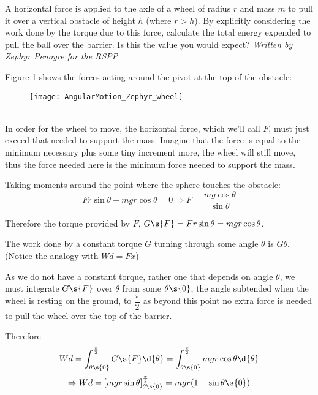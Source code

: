 \begin{problem}[Zephyr_ball_diagram] %
{A horizontal force is applied to the axle of a wheel of radius $r$ and mass $m$ to pull it over a vertical obstacle of height $h$ (where $r > h$). By explicitly considering the work done by the torque due to this force, calculate the total energy expended to pull the ball over the barrier. Is this the value you would expect?}
{\textit{Written by Zephyr Penoyre for the RSPP}}
{
Figure \ref{fig:AngularMotion_Zephyr_wheel} shows the forces acting around the pivot at the top of the obstacle:
\begin{figure}[h]
\centering
\texttt{[image: AngularMotion\_Zephyr\_wheel]}
\caption{}
\label{fig:AngularMotion_Zephyr_wheel}
\end{figure}
\\
In order for the wheel to move, the horizontal force, which we'll call $F$, must just exceed that needed to support the mass. Imagine that the force is equal to the minimum necessary plus some tiny increment more, the wheel will still move, thus the force needed here is the minimum force needed to support the mass.

Taking moments around the point where the sphere touches the obstacle:
\begin{equation*}
Fr\sin{\theta} - mgr\cos{\theta} = 0 \Rightarrow F = \dfrac{mg\cos{\theta}}{\sin{\theta}}
\end{equation*}

Therefore the torque provided by $F$, $G\s{F} = Fr\sin{\theta} = mgr\cos{\theta}$.

The work done by a constant torque $G$ turning through some angle $\theta$ is $G\theta$. (Notice the analogy with $Wd = F x$)

As we do not have a constant torque, rather one that depends on angle $\theta$, we must integrate $G\s{F}$ over $\theta$ from some $\theta\s{0}$, the angle subtended when the wheel is resting on the ground, to $\dfrac{\pi}{2}$ as beyond this point no extra force is needed to pull the wheel over the top of the barrier.

Therefore
\begin{equation*}
Wd = \int_{\theta\s{0}}^{\frac{\pi}{2}} G\s{F} \d{\theta} =  \int_{\theta\s{0}}^{\frac{\pi}{2}} mgr\cos{\theta} \d{\theta}
\end{equation*}
\begin{equation}
\Rightarrow Wd = \left[mgr\sin{\theta} \right]_{\theta\s{0}}^{\frac{\pi}{2}} = mgr(1 - \sin{\theta\s{0}})
\label{workDone}
\end{equation}

}
\end{problem}
